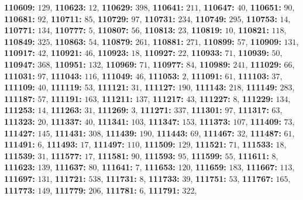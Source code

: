 \textsf{\bfseries 110609:} $129$, \textsf{\bfseries 110623:} $12$, \textsf{\bfseries 110629:} $398$, \textsf{\bfseries 110641:} $211$, \textsf{\bfseries 110647:} $40$, \textsf{\bfseries 110651:} $90$, \textsf{\bfseries 110681:} $92$, \textsf{\bfseries 110711:} $85$, \textsf{\bfseries 110729:} $97$, \textsf{\bfseries 110731:} $234$, \textsf{\bfseries 110749:} $295$, \textsf{\bfseries 110753:} $14$, \textsf{\bfseries 110771:} $134$, \textsf{\bfseries 110777:} $5$, \textsf{\bfseries 110807:} $56$, \textsf{\bfseries 110813:} $23$, \textsf{\bfseries 110819:} $10$, \textsf{\bfseries 110821:} $118$, \textsf{\bfseries 110849:} $325$, \textsf{\bfseries 110863:} $54$, \textsf{\bfseries 110879:} $261$, \textsf{\bfseries 110881:} $271$, \textsf{\bfseries 110899:} $57$, \textsf{\bfseries 110909:} $131$, \textsf{\bfseries 110917:} $42$, \textsf{\bfseries 110921:} $46$, \textsf{\bfseries 110923:} $18$, \textsf{\bfseries 110927:} $22$, \textsf{\bfseries 110933:} $71$, \textsf{\bfseries 110939:} $50$, \textsf{\bfseries 110947:} $368$, \textsf{\bfseries 110951:} $132$, \textsf{\bfseries 110969:} $71$, \textsf{\bfseries 110977:} $84$, \textsf{\bfseries 110989:} $241$, \textsf{\bfseries 111029:} $66$, \textsf{\bfseries 111031:} $97$, \textsf{\bfseries 111043:} $116$, \textsf{\bfseries 111049:} $46$, \textsf{\bfseries 111053:} $2$, \textsf{\bfseries 111091:} $61$, \textsf{\bfseries 111103:} $37$, \textsf{\bfseries 111109:} $40$, \textsf{\bfseries 111119:} $53$, \textsf{\bfseries 111121:} $31$, \textsf{\bfseries 111127:} $190$, \textsf{\bfseries 111143:} $218$, \textsf{\bfseries 111149:} $283$, \textsf{\bfseries 111187:} $57$, \textsf{\bfseries 111191:} $163$, \textsf{\bfseries 111211:} $137$, \textsf{\bfseries 111217:} $43$, \textsf{\bfseries 111227:} $8$, \textsf{\bfseries 111229:} $134$, \textsf{\bfseries 111253:} $14$, \textsf{\bfseries 111263:} $31$, \textsf{\bfseries 111269:} $3$, \textsf{\bfseries 111271:} $337$, \textsf{\bfseries 111301:} $97$, \textsf{\bfseries 111317:} $63$, \textsf{\bfseries 111323:} $20$, \textsf{\bfseries 111337:} $40$, \textsf{\bfseries 111341:} $103$, \textsf{\bfseries 111347:} $153$, \textsf{\bfseries 111373:} $107$, \textsf{\bfseries 111409:} $73$, \textsf{\bfseries 111427:} $145$, \textsf{\bfseries 111431:} $308$, \textsf{\bfseries 111439:} $190$, \textsf{\bfseries 111443:} $69$, \textsf{\bfseries 111467:} $32$, \textsf{\bfseries 111487:} $61$, \textsf{\bfseries 111491:} $6$, \textsf{\bfseries 111493:} $17$, \textsf{\bfseries 111497:} $110$, \textsf{\bfseries 111509:} $129$, \textsf{\bfseries 111521:} $71$, \textsf{\bfseries 111533:} $18$, \textsf{\bfseries 111539:} $31$, \textsf{\bfseries 111577:} $17$, \textsf{\bfseries 111581:} $90$, \textsf{\bfseries 111593:} $95$, \textsf{\bfseries 111599:} $55$, \textsf{\bfseries 111611:} $8$, \textsf{\bfseries 111623:} $139$, \textsf{\bfseries 111637:} $80$, \textsf{\bfseries 111641:} $7$, \textsf{\bfseries 111653:} $120$, \textsf{\bfseries 111659:} $183$, \textsf{\bfseries 111667:} $113$, \textsf{\bfseries 111697:} $131$, \textsf{\bfseries 111721:} $538$, \textsf{\bfseries 111731:} $8$, \textsf{\bfseries 111733:} $39$, \textsf{\bfseries 111751:} $53$, \textsf{\bfseries 111767:} $165$, \textsf{\bfseries 111773:} $149$, \textsf{\bfseries 111779:} $206$, \textsf{\bfseries 111781:} $6$, \textsf{\bfseries 111791:} $322$, 
